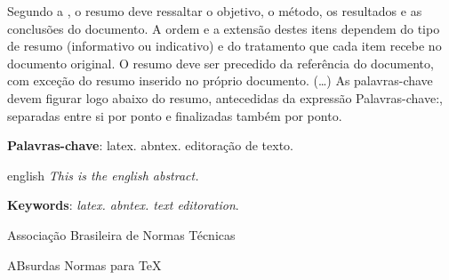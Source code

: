 \documentclass[
	12pt,				%
	openright,			%
	oneside,			%
	a4paper,			%
	english,			%
	brazil				%
	]{abntex2}
\newcommand{\listofquadrosname}{Lista de quadros}
\begin{document}

\setlength{\absparsep}{18pt} %
\begin{resumo}
 Segundo a , o resumo deve ressaltar o
 objetivo, o método, os resultados e as conclusões do documento. A ordem e a extensão
 destes itens dependem do tipo de resumo (informativo ou indicativo) e do
 tratamento que cada item recebe no documento original. O resumo deve ser
 precedido da referência do documento, com exceção do resumo inserido no
 próprio documento. (\ldots) As palavras-chave devem figurar logo abaixo do
 resumo, antecedidas da expressão Palavras-chave:, separadas entre si por
 ponto e finalizadas também por ponto.

 \textbf{Palavras-chave}: latex. abntex. editoração de texto.
\end{resumo}

\begin{resumo}
 \begin{otherlanguage*}{english}
\textit{   This is the english abstract.}

   \vspace{\onelineskip}
 
   \noindent 
   \textbf{Keywords}: \textit{latex. abntex. text editoration}.
 \end{otherlanguage*}
\end{resumo}


\listoffigures*
\cleardoublepage

\pdfbookmark[0]{\listofquadrosname}{loq}
\listofquadros*
\cleardoublepage

\listoftables*
\cleardoublepage

\begin{siglas}
  \item[ABNT] Associação Brasileira de Normas Técnicas
  \item[abnTeX] ABsurdas Normas para TeX
\end{siglas}


\tableofcontents*
\cleardoublepage
\end{document}

